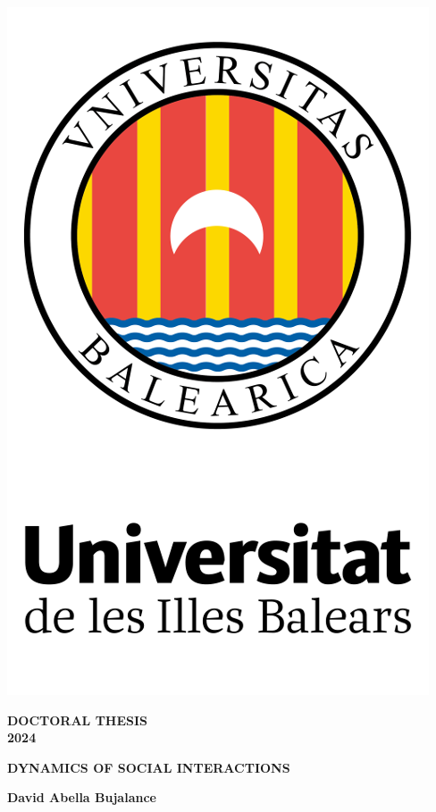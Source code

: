 \begin{titlepage}
    	\large

        \begin{center}
            \sffamily
            \includegraphics[width=.35\textwidth]{Figs/uib.png}
        
            \vspace*{.05\textheight}

			{\Huge\bfseries DOCTORAL THESIS} \\
			{\Huge \bfseries 2024}

            \vspace*{.15\textheight}

			\begingroup
				{\Huge\bfseries DYNAMICS OF SOCIAL INTERACTIONS \par}
			\endgroup

            \vfill

            {\Large \bfseries David Abella Bujalance}
        \end{center}
\end{titlepage}